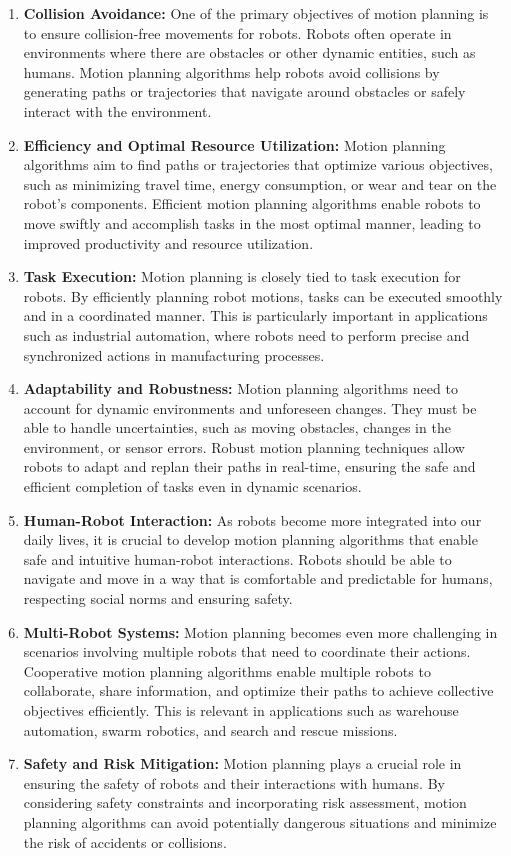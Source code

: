 \begin{enumerate}
    \item \textbf{Collision Avoidance:} One of the primary objectives of motion planning is to ensure collision-free movements for robots. Robots often operate in environments where there are obstacles or other dynamic entities, such as humans. Motion planning algorithms help robots avoid collisions by generating paths or trajectories that navigate around obstacles or safely interact with the environment.
    \item \textbf{Efficiency and Optimal Resource Utilization:} Motion planning algorithms aim to find paths or trajectories that optimize various objectives, such as minimizing travel time, energy consumption, or wear and tear on the robot's components. Efficient motion planning algorithms enable robots to move swiftly and accomplish tasks in the most optimal manner, leading to improved productivity and resource utilization.
    \item \textbf{Task Execution:} Motion planning is closely tied to task execution for robots. By efficiently planning robot motions, tasks can be executed smoothly and in a coordinated manner. This is particularly important in applications such as industrial automation, where robots need to perform precise and synchronized actions in manufacturing processes.
    \item \textbf{Adaptability and Robustness:} Motion planning algorithms need to account for dynamic environments and unforeseen changes. They must be able to handle uncertainties, such as moving obstacles, changes in the environment, or sensor errors. Robust motion planning techniques allow robots to adapt and replan their paths in real-time, ensuring the safe and efficient completion of tasks even in dynamic scenarios.
    \item \textbf{Human-Robot Interaction:} As robots become more integrated into our daily lives, it is crucial to develop motion planning algorithms that enable safe and intuitive human-robot interactions. Robots should be able to navigate and move in a way that is comfortable and predictable for humans, respecting social norms and ensuring safety.
    \item \textbf{Multi-Robot Systems:} Motion planning becomes even more challenging in scenarios involving multiple robots that need to coordinate their actions. Cooperative motion planning algorithms enable multiple robots to collaborate, share information, and optimize their paths to achieve collective objectives efficiently. This is relevant in applications such as warehouse automation, swarm robotics, and search and rescue missions.
    \item \textbf{Safety and Risk Mitigation:} Motion planning plays a crucial role in ensuring the safety of robots and their interactions with humans. By considering safety constraints and incorporating risk assessment, motion planning algorithms can avoid potentially dangerous situations and minimize the risk of accidents or collisions.
\end{enumerate}

